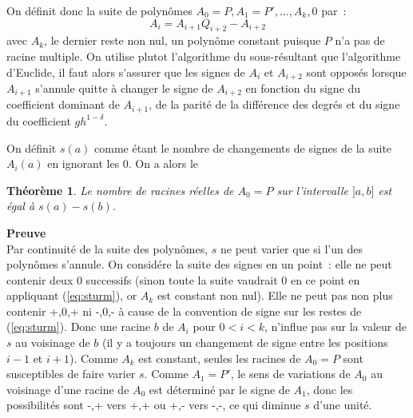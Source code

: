 \documentclass[a4paper,11pt]{article}
\newtheorem{thm}{Théorème}
\begin{document}
\begin{giacjshere}
On d\'efinit donc la suite de polyn\^omes $A_0=P, A_1=P', ..., A_k,0$
par~:
\begin{equation} \label{eq:sturm}
 A_{i} = A_{i+1} Q_{i+2} - A_{i+2} 
\end{equation}
avec $A_k$, le dernier reste non nul, un polyn\^ome constant puisque
$P$ n'a pas de racine multiple. On utilise plutot l'algorithme du 
sous-r\'esultant que l'algorithme d'Euclide, il faut alors
s'assurer que les signes de $A_i$ et $A_{i+2}$ sont oppos\'es lorsque
$A_{i+1} $ s'annule quitte \`a changer le signe de $A_{i+2}$ en fonction
du signe du coefficient dominant de $A_{i+1}$, de la parit\'e de
la diff\'erence des degr\'es et du signe du coefficient $gh^{1-\delta}$.

On d\'efinit $s(a)$ comme \'etant le nombre de changements de signes
de la suite $A_i(a)$ en ignorant les 0.
On a alors le 
\begin{thm}
Le nombre de racines r\'eelles de $A_0=P$ sur l'intervalle
$]a,b]$ est \'egal \`a $s(a)-s(b)$.
\end{thm}

{\bf Preuve}\\
Par continuit\'e de la suite des polyn\^omes, $s$ ne peut varier que
si l'un des polyn\^omes s'annule.
On consid\'ere la suite des signes en un point~: elle ne peut contenir
deux 0 successifs (sinon toute la suite vaudrait 0 en ce point en appliquant
(\ref{eq:sturm}), or $A_k$ est constant non nul). Elle ne peut pas
non plus contenir +,0,+ ni -,0,- \`a cause de la convention de signe
sur les restes de (\ref{eq:sturm}). Donc une racine $b$
de $A_i$ pour $0<i<k$, n'influe pas sur la valeur de $s$ au voisinage
de $b$ (il y a toujours un changement de signe entre les positions
$i-1$ et $i+1$). Comme $A_k$ est constant, seules les racines de $A_0=P$
sont susceptibles de faire varier $s$. Comme $A_1=P'$, le sens de
variations de $A_0$ au voisinage d'une racine de $A_0$ est d\'etermin\'e
par le signe de $A_1$, donc les possibilit\'es sont -,+ vers +,+
ou +,- vers -,-, ce qui diminue $s$ d'une unit\'e.



\end{giacjshere}
\end{document}
